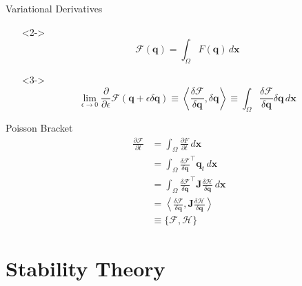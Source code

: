 \documentclass{beamer}
\begin{document}
		\begin{frame}[t]{Variational Derivatives}
			\begin{itemize}
				\item[]<2->$$ \mathcal{F}(\mathbf{q}) = \int_\Omega F(\mathbf{q}) \, d\mathbf{x} $$
				\item[]<3->$$ \lim_{\epsilon \rightarrow 0} \frac{\partial}{\partial \epsilon}\mathcal{F}(\mathbf{q} + \epsilon\delta\mathbf{q}) \equiv \left< \frac{\delta \mathcal{F}}{\delta \mathbf{q}}, \delta\mathbf{q} \right> \equiv \int_\Omega \frac{\delta \mathcal{F}}{\delta \mathbf{q}} \delta\mathbf{q} \, d\mathbf{x} $$
			\end{itemize}
		\end{frame}
		\begin{frame}[t]{Poisson Bracket}
			\begin{align*}
					\frac{\partial \mathcal{F}}{\partial t}
					&= \int_\Omega \frac{\partial F}{\partial t} \, d\mathbf{x} \\
					&= \int_\Omega \frac{\delta \mathcal{F}}{\delta \mathbf{q}}^\top \mathbf{q}_t\, d\mathbf{x} \\
					&= \int_\Omega \frac{\delta \mathcal{F}}{\delta \mathbf{q}}^\top \mathbf{J}\frac{\delta \mathcal{H}}{\delta \mathbf{q}}\, d\mathbf{x} \\
					&= \left< \frac{\delta \mathcal{F}}{\delta \mathbf{q}}, \mathbf{J}\frac{\delta \mathcal{H}}{\delta \mathbf{q}} \right> \\
					&\equiv \{\mathcal{F}, \mathcal{H}\}
				\end{align*}
		\end{frame}

	\section{Stability Theory}
\end{document}
